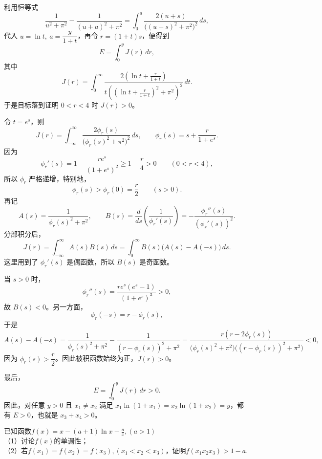 \begin{solution}
利用恒等式
\[
\frac{1}{u^2+\pi^2}-\frac{1}{(u+a)^2+\pi^2}
=\int_0^a\frac{2(u+s)}{\bigl((u+s)^2+\pi^2\bigr)^2}\,ds,
\]
代入 $u=\ln t,\ a=\dfrac{y}{1+t}$，再令 $r=(1+t)s$，便得到
\[
E=\int_0^y J(r)\,dr,
\]
其中
\[
J(r)=\int_0^\infty\frac{2\left(\ln t+\frac{r}{1+t}\right)}{t\left(\left(\ln t+\frac{r}{1+t}\right)^2+\pi^2\right)^2}\,dt.
\]
于是目标落到证明 $0<r<4$ 时 $J(r)>0$。

令 $t=e^s$，则
\[
J(r)=\int_{-\infty}^\infty\frac{2\phi_r(s)}{\bigl(\phi_r(s)^2+\pi^2\bigr)^2}\,ds,
\qquad
\phi_r(s)=s+\frac{r}{1+e^s}.
\]
因为
\[
\phi_r'(s)=1-\frac{re^s}{(1+e^s)^2}\ge 1-\frac r4>0\qquad (0<r<4),
\]
所以 $\phi_r$ 严格递增，特别地，
\[
\phi_r(s)>\phi_r(0)=\frac r2\qquad (s>0).
\]
再记
\[
A(s)=\frac{1}{\phi_r(s)^2+\pi^2},\qquad
B(s)=\frac{d}{ds}\left(\frac1{\phi_r'(s)}\right)=-\frac{\phi_r''(s)}{(\phi_r'(s))^2}.
\]
分部积分后，
\[
J(r)=\int_{-\infty}^\infty A(s)B(s)\,ds
=\int_0^\infty B(s)\bigl(A(s)-A(-s)\bigr)\,ds.
\]
这里用到了 $\phi_r'(s)$ 是偶函数，所以 $B(s)$ 是奇函数。

当 $s>0$ 时，
\[
\phi_r''(s)=\frac{re^s(e^s-1)}{(1+e^s)^3}>0,
\]
故 $B(s)<0$。另一方面，
\[
\phi_r(-s)=r-\phi_r(s),
\]
于是
\[
A(s)-A(-s)
=\frac{1}{\phi_r(s)^2+\pi^2}-\frac{1}{(r-\phi_r(s))^2+\pi^2}
=\frac{r(r-2\phi_r(s))}{\bigl(\phi_r(s)^2+\pi^2\bigr)\bigl((r-\phi_r(s))^2+\pi^2\bigr)}<0,
\]
因为 $\phi_r(s)>\dfrac r2$。因此被积函数始终为正，$J(r)>0$。

最后，
\[
E=\int_0^yJ(r)\,dr>0.
\]
因此，对任意 $y>0$ 且 $x_1\ne x_2$ 满足 $x_1\ln(1+x_1)=x_2\ln(1+x_2)=y$，都有 $E>0$，也就是 $x_3+x_4>0$。
\end{solution}
\newpage
\begin{example}[$f(x_1x_2x_3)>1-a$]
    已知函数$f(x)=x-(a+1)\ln x-\frac{a}{x},(a>1)$\\
    （1）讨论$f(x)$的单调性；\\
    （2）若$f(x_1)=f(x_2)=f(x_3),(x_1<x_2<x_3)$，证明$f(x_1x_2x_3)>1-a$.
\end{example}
